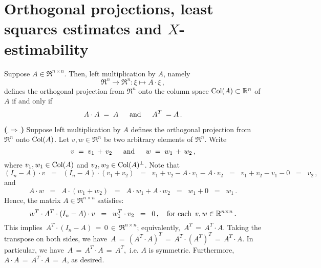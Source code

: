 

\section{Orthogonal projections, least squares estimates and $X$-estimability}
\setcounter{theorem}{0}
\setcounter{equation}{0}

\renewcommand{\theenumi}{\roman{enumi}}
\renewcommand{\labelenumi}{\textnormal{(\theenumi)}$\;\;$}


\begin{proposition}
\mbox{}\vskip 0.1cm\noindent
Suppose $A \in \Re^{n \times n}$.
Then, left multiplication by $A$, namely
\begin{equation*}
\Re^{n} \longrightarrow \Re^{n} : \xi \longmapsto A\cdot\xi\,,
\end{equation*}
defines the orthogonal projection from $\Re^{n}$ onto the column space
$\Col(A) \subset \Re^{n}$ of $A$
if and only if
\begin{equation*}
A \cdot A \; = \; A
\quad\;\;\textnormal{and}\quad\;\;
A^{T} \; = A\,.
\end{equation*}
\end{proposition}
\proof
\vskip 0.1cm
\noindent
\underline{\textbf{(\,$\Longrightarrow$\,)}}\quad
Suppose left multiplication by $A$ defines the orthogonal projection
from $\Re^{n}$ onto $\Col(A)$.
Let $v, w \in \Re^{n}$ be two arbitrary elements of $\Re^{n}$.
Write
\begin{equation*}
v \;=\; v_{1} \,+\, v_{2}
\quad\;\;\textnormal{and}\quad\;\;
w \;=\; w_{1} \,+\, w_{2}\,,
\end{equation*}
where $v_{1}, w_{1} \in \Col(A)$ and $v_{2}, w_{2} \in \Col(A)^{\perp}$.
Note that
\begin{equation*}
(I_{n} - A) \cdot v
\;\;=\;\;
	(I_{n} - A) \cdot (v_{1} + v_{2})
\;\;=\;\;
	v_{1} + v_{2} - A \cdot v_{1} - A \cdot v_{2}
\;\;=\;\;
	v_{1} + v_{2} - v_{1} - 0
\;\;=\;\;
	v_{2}\,,
\end{equation*}
and
\begin{equation*}
A\cdot w
\;\;=\;\;
	A\cdot(w_{1} + w_{2})
\;\;=\;\;
	A \cdot w_{1} + A \cdot w_{2}
\;\;=\;\;
	w_{1} + 0
\;\;=\;\;
	w_{1}\,.
\end{equation*}
Hence, the matrix $A \in \Re^{n \times n}$ satisfies:
\begin{equation*}
w^{T} \cdot A^{T} \cdot (I_{n} - A) \cdot v
\;\;=\;\;
	w_{1}^{T} \cdot v_{2}
\;\;=\;\;
	0\,,
\quad\textnormal{for each \,$v, w \in \Re^{n \times n}$}\,.
\end{equation*}
This implies \,$A^{T} \cdot (I_{n} - A) \,=\, 0 \,\in\, \Re^{n \times n}$;
equivalently, \,$A^{T} \,=\, A^{T} \cdot A$.
Taking the transpose on both sides, we have
\,$A \,=\, (A^{T} \cdot A)^{T} \,=\, A^{T} \cdot (A^{T})^{T} \,=\, A^{T} \cdot A$.
In particular, we have \,$A \,=\, A^{T} \cdot A \,=\, A^{T}$,\, i.e. $A$ is symmetric.
Furthermore, $A \cdot A \,=\, A^{T} \cdot A \,=\, A$, as desired.

